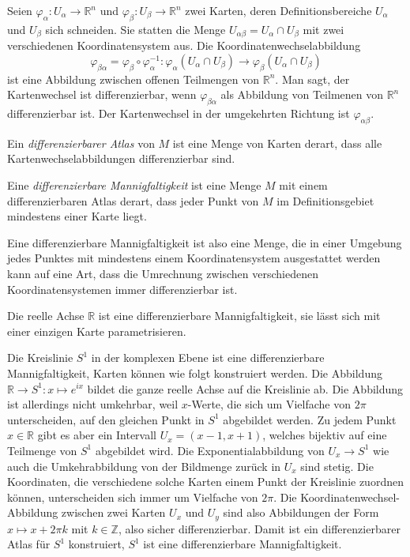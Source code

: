 Seien 
$\varphi_\alpha\colon U_\alpha \to \mathbb{R}^n$
und
$\varphi_\beta\colon U_\beta \to \mathbb{R}^n$
zwei Karten, deren Definitionsbereiche $U_\alpha$ und $U_\beta$ sich
schneiden.
Sie statten die Menge $U_{\alpha\beta}=U_\alpha\cap U_\beta$
mit zwei verschiedenen Koordinatensystem aus.
Die Koordinatenwechselabbildung
\[
\varphi_{\beta\alpha}
=
\varphi_\beta
\circ
\varphi_\alpha^{-1}
\colon
\varphi_\alpha(U_\alpha\cap U_\beta)
\to
\varphi_\beta(U_\alpha\cap U_\beta)
\]
ist eine Abbildung zwischen offenen Teilmengen von $\mathbb{R}^n$.
Man sagt, der Kartenwechsel ist differenzierbar, wenn $\varphi_{\beta\alpha}$
als Abbildung von Teilmenen von $\mathbb{R}^n$
differenzierbar ist.
Der Kartenwechsel in der umgekehrten Richtung ist $\varphi_{\alpha\beta}$.

\begin{definition}
\label{buch:gruppen:gruppe:def:atlas}
Ein {\em differenzierbarer Atlas} von $M$ ist eine Menge von Karten derart,
dass alle Kartenwechselabbildungen differenzierbar sind.
\end{definition}

\begin{definition}
\label{buch:gruppen:gruppe:def:diffman}
Eine {\em differenzierbare Mannigfaltigkeit} ist eine Menge $M$ mit einem
differenzierbaren Atlas derart, dass jeder Punkt von $M$ im
Definitionsgebiet mindestens einer Karte liegt.
\end{definition}

Eine differenzierbare Mannigfaltigkeit ist also eine Menge, die in
einer Umgebung jedes Punktes mit mindestens einem Koordinatensystem
ausgestattet werden kann auf eine Art, dass die Umrechnung zwischen
verschiedenen Koordinatensystemen immer differenzierbar ist.

\begin{beispiel}
Die reelle Achse $\mathbb{R}$ ist eine differenzierbare Mannigfaltigkeit,
sie lässt sich mit einer einzigen Karte parametrisieren.
\end{beispiel}

\begin{beispiel}
Die Kreislinie $S^1$ in der komplexen Ebene ist eine differenzierbare
Mannigfaltigkeit, Karten können wie folgt konstruiert werden.
Die Abbildung $\mathbb{R}\to S^1: x\mapsto e^{ix}$ bildet die ganze
reelle Achse auf die Kreislinie ab.
Die Abbildung ist allerdings nicht umkehrbar, weil $x$-Werte, die sich
um Vielfache von $2\pi$ unterscheiden, auf den gleichen Punkt in $S^1$
abgebildet werden.
Zu jedem Punkt $x\in\mathbb{R}$ gibt es aber ein Intervall
$U_x=(x-1,x+1)$, welches bijektiv auf eine Teilmenge von $S^1$
abgebildet wird.
Die Exponentialabbildung von $U_x\to S^1$ wie auch die Umkehrabbildung
von der Bildmenge zurück in $U_x$ sind stetig.
Die Koordinaten, die verschiedene solche Karten einem Punkt der Kreislinie
zuordnen können, unterscheiden sich immer um Vielfache von $2\pi$.
Die Koordinatenwechsel-Abbildung zwischen zwei Karten $U_x$ und $U_y$
sind also Abbildungen der Form $x\mapsto x+2\pi k$ mit $k\in\mathbb{Z}$,
also sicher differenzierbar.
Damit ist ein differenzierbarer Atlas für $S^1$ konstruiert, $S^1$
ist eine differenzierbare Mannigfaltigkeit.
\end{beispiel}

